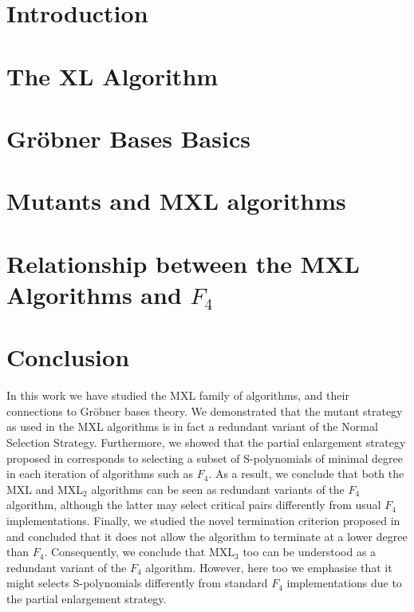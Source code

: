 \documentclass[preprint,draft]{elsarticle}
\begin{document}
\section{Introduction} \label{sec:intro}


\section{The XL Algorithm} \label{sec:xl}


\section{Gr\"obner Bases Basics} \label{sec:gb}


\section{Mutants and MXL algorithms} \label{sec:mutants}    


\section{Relationship between the MXL Algorithms and $F_4$} \label{sec:relation}


\section{Conclusion}
\label{sec:conclusion}
In this work we have studied the MXL family of algorithms, and their connections to Gr\"obner bases theory. We demonstrated that the mutant strategy as used in the MXL algorithms is in fact a 
redundant variant of the Normal Selection Strategy. 
Furthermore, we showed that the partial enlargement strategy proposed in \cite{mxl2} corresponds to selecting a subset of S-polynomials of minimal degree in each iteration of algorithms such as $F_4$. 
As a result, we conclude that both the MXL and MXL$_2$ algorithms can be seen as redundant variants of the $F_4$ algorithm, although the latter may select critical pairs differently from usual $F_4$ implementations. Finally, we studied the novel termination criterion proposed in \cite{mxl3} and concluded that it does not allow the algorithm to terminate at a lower degree than $F_4$. Consequently, we conclude that MXL$_3$ too can be understood as a redundant variant of the $F_4$ algorithm. However, here too we emphasise that it might selects S-polynomials differently from standard $F_4$ implementations due to the partial enlargement strategy.
\end{document}
